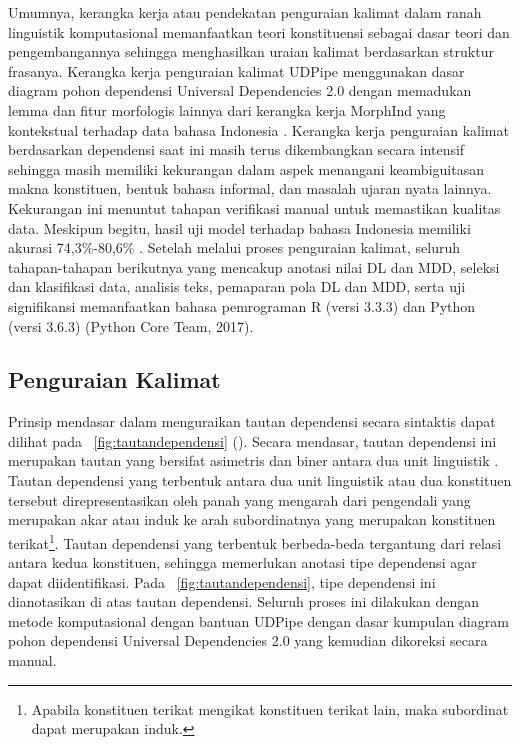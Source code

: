 Umumnya, kerangka kerja atau pendekatan penguraian kalimat dalam ranah linguistik komputasional memanfaatkan teori konstituensi sebagai dasar teori dan pengembangannya sehingga menghasilkan uraian kalimat berdasarkan struktur frasanya. Kerangka kerja penguraian kalimat UDPipe menggunakan dasar diagram pohon dependensi Universal Dependencies 2.0 \citep{nivre2017universal} dengan memadukan lemma dan fitur morfologis lainnya dari kerangka kerja MorphInd yang kontekstual terhadap data bahasa Indonesia \citep{larasati2011indonesian}. Kerangka kerja penguraian kalimat berdasarkan dependensi saat ini masih terus dikembangkan secara intensif sehingga masih memiliki kekurangan dalam aspek menangani keambiguitasan makna konstituen, bentuk bahasa informal, dan masalah ujaran nyata lainnya. Kekurangan ini menuntut tahapan verifikasi manual untuk memastikan kualitas data. Meskipun begitu, hasil uji model terhadap bahasa Indonesia memiliki akurasi 74,3\%-80,6\% \citep{udpipe2017}. Setelah melalui proses penguraian kalimat, seluruh tahapan-tahapan berikutnya yang mencakup anotasi nilai DL dan MDD, seleksi dan klasifikasi data, analisis teks, pemaparan pola DL dan MDD, serta uji signifikansi memanfaatkan bahasa pemrograman R (versi 3.3.3) \citep{r2017project} dan Python (versi 3.6.3) (Python Core Team, 2017).

\subsection{Penguraian Kalimat}
Prinsip mendasar dalam menguraikan tautan dependensi secara sintaktis dapat dilihat pada \pic~\ref{fig:tautandependensi} (\citealp{tesniere1959elements, hudson1984word, liu2008dependency, liu2017dependency}). Secara mendasar, tautan dependensi ini merupakan tautan yang bersifat asimetris dan biner antara dua unit linguistik \citep{tesniere1959elements}. Tautan dependensi yang terbentuk antara dua unit linguistik atau dua konstituen tersebut direpresentasikan oleh panah yang mengarah dari pengendali yang merupakan akar atau induk ke arah subordinatnya yang merupakan konstituen terikat\footnote{Apabila konstituen terikat mengikat konstituen terikat lain, maka subordinat dapat merupakan induk.}. Tautan dependensi yang terbentuk berbeda-beda tergantung dari relasi antara kedua konstituen, sehingga memerlukan anotasi tipe dependensi agar dapat diidentifikasi. Pada \pic~\ref{fig:tautandependensi}, tipe dependensi ini dianotasikan di atas tautan dependensi. Seluruh proses ini dilakukan dengan metode komputasional dengan bantuan UDPipe \citep{udpipe2017} dengan dasar kumpulan diagram pohon dependensi Universal Dependencies 2.0 \citep{nivre2017universal} yang kemudian dikoreksi secara manual.

